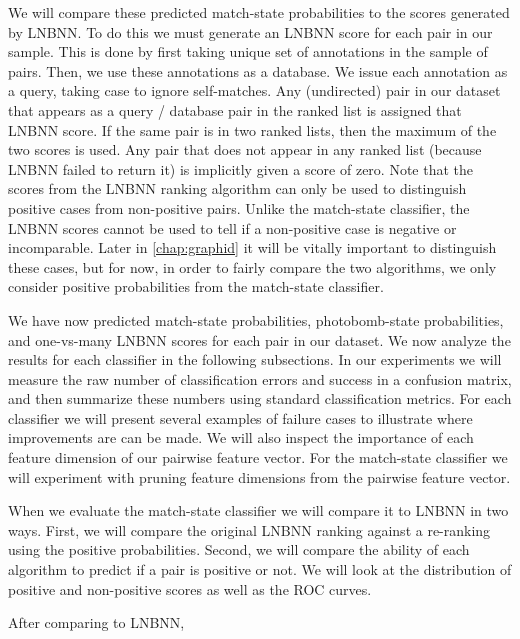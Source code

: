     We will compare these predicted match-state probabilities to the scores generated by LNBNN.
    To do this we must generate an LNBNN score for each pair in our sample.
    This is done by first taking unique set of annotations in the sample of pairs.
    Then, we use these annotations as a database.
    We issue each annotation as a query, taking case to ignore self-matches.
    Any (undirected) pair in our dataset that appears as a query / database pair in the ranked list is assigned
      that LNBNN score.
    If the same pair is in two ranked lists, then the maximum of the two scores is used.
    Any pair that does not appear in any ranked list (because LNBNN failed to return it) is implicitly given a
      score of zero.
    Note that the scores from the LNBNN ranking algorithm can only be used to distinguish positive cases from
      non-positive pairs.
    Unlike the match-state classifier, the LNBNN scores cannot be used to tell if a non-positive case is negative
      or incomparable.
    Later in \cref{chap:graphid} it will be vitally important to distinguish these cases, but for now, in order
      to fairly compare the two algorithms, we only consider positive probabilities from the match-state
      classifier.

    We have now predicted match-state probabilities, photobomb-state probabilities, and one-vs-many LNBNN scores
      for each pair in our dataset.
    We now analyze the results for each classifier in the following subsections.
    In our experiments we will measure the raw number of classification errors and success in a confusion matrix,
      and then summarize these numbers using standard classification metrics.
    For each classifier we will present several examples of failure cases to illustrate where improvements are
      can be made.
    We will also inspect the importance of each feature dimension of our pairwise feature vector.
    For the match-state classifier we will experiment with pruning feature dimensions from the pairwise feature
      vector.

    When we evaluate the match-state classifier we will compare it to LNBNN in two ways.
    First, we will compare the original LNBNN ranking against a re-ranking using the positive probabilities.
    Second, we will compare the ability of each algorithm to predict if a pair is positive or not.
    We will look at the distribution of positive and non-positive scores as well as the ROC curves.

    After comparing to LNBNN, 

